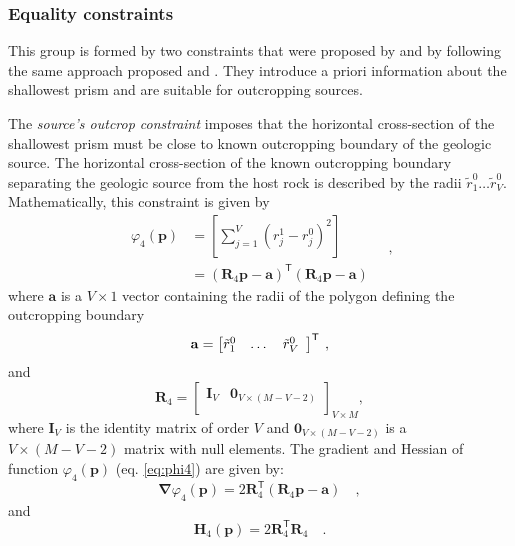 \subsubsection{Equality constraints}

This group is formed by two constraints that were proposed by \cite{oliveirajr-etal2011} and \cite{oliveirajr-barbosa2013} by following the same approach proposed \cite{barbosa-etal1997} and \cite{barbosa-1999a}. 
They introduce a priori information about the shallowest prism and are  suitable for outcropping sources.

The \textit{source’s outcrop constraint} imposes that the horizontal cross-section of the shallowest prism must be close to known outcropping boundary of the geologic source.
The horizontal cross-section of the known outcropping boundary separating the geologic  source from the host rock is described by the radii $\tilde{r}_{1}^{0} \dots \tilde{r}_{V}^{0}$. Mathematically, this constraint is given by
\begin{equation}\label{eq:phi4}
\begin{split}
\varphi_{4}(\mathbf{p}) &= \left[ \sum\limits^{V}_{j=1}\left(r^{1}_{j}-r^{0}_{j}\right)^2\right] \\
&= \left(\mathbf{R}_{4} \mathbf{p} - \mathbf{a} \right)^{\mathsf{T}} 
\left(\mathbf{R}_{4} \mathbf{p} - \mathbf{a} \right)
\end{split} \quad ,
\end{equation}
where $\mathbf{a}$ is a $V \times 1$ vector containing the radii of the polygon defining the outcropping boundary
\begin{equation}
\mathbf{a} = \left[ \begin{array}{@{}*{12}{c}@{}}
\tilde{r}_{1}^{0} & \dots & \tilde{r}_{V}^{0}  \\
\end{array} \right]^{\mathsf{T}} \: ,
\label{eq:a-vector}
\end{equation}
and
\begin{equation}
\mathbf{R}_{4} = 
\begin{bmatrix}
\mathbf{I}_{V} & \mathbf{0}_{V \times (M-V-2)} \\
\end{bmatrix}_{V\times M},
\label{eq:R4-matrix}
\end{equation}
where $\mathbf{I}_{V}$ is the identity matrix of order $V$ and 
$\mathbf{0}_{V \times (M-V-2)}$ is a $V \times (M-V-2)$ matrix with null elements.
The gradient and Hessian of function $\varphi_{4}(\mathbf{p})$ (eq. \ref{eq:phi4}) are given by:
\begin{equation}\label{eq:phi4_grad}
\boldsymbol{\nabla}\varphi_{4}(\mathbf{p}) = 2 \mathbf{R}_{4}^{\mathsf{T}} 
\left(\mathbf{R}_{4} \mathbf{p} - \mathbf{a} \right) \quad ,
\end{equation}
and
\begin{equation}\label{eq:phi4_hessian}
\mathbf{H}_{4}(\mathbf{p}) = 2 \mathbf{R}^{\mathsf{T}}_{4}\mathbf{R}_{4} \quad .
\end{equation}

